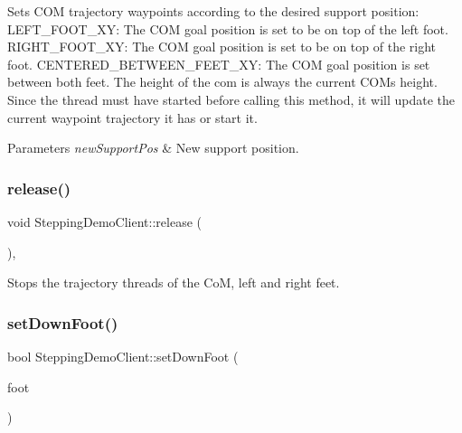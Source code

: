 Sets C\+OM trajectory waypoints according to the desired support position\+: L\+E\+F\+T\+\_\+\+F\+O\+O\+T\+\_\+\+XY\+: The C\+OM goal position is set to be on top of the left foot. R\+I\+G\+H\+T\+\_\+\+F\+O\+O\+T\+\_\+\+XY\+: The C\+OM goal position is set to be on top of the right foot. C\+E\+N\+T\+E\+R\+E\+D\+\_\+\+B\+E\+T\+W\+E\+E\+N\+\_\+\+F\+E\+E\+T\+\_\+\+XY\+: The C\+OM goal position is set between both feet. The height of the com is always the current C\+OM\textquotesingle{}s height. Since the thread must have started before calling this method, it will update the current waypoint trajectory it has or start it.


\begin{DoxyParams}{Parameters}
{\em new\+Support\+Pos} & New support position. \\
\hline
\end{DoxyParams}
\hypertarget{classSteppingDemoClient_aafcb227c0d7ce24823957e2331caa88b}{}\label{classSteppingDemoClient_aafcb227c0d7ce24823957e2331caa88b} 
\subsubsection{\texorpdfstring{release()}{release()}}
{\footnotesize\ttfamily void Stepping\+Demo\+Client\+::release (\begin{DoxyParamCaption}{ }\end{DoxyParamCaption})\hspace{0.3cm}{\ttfamily [protected]}, {\ttfamily [virtual]}}

Stops the trajectory threads of the CoM, left and right feet. \hypertarget{classSteppingDemoClient_a930123dad5658ea8a3bb5f23cb4cb369}{}\label{classSteppingDemoClient_a930123dad5658ea8a3bb5f23cb4cb369} 
\subsubsection{\texorpdfstring{set\+Down\+Foot()}{setDownFoot()}}
{\footnotesize\ttfamily bool Stepping\+Demo\+Client\+::set\+Down\+Foot (\begin{DoxyParamCaption}\item[{\hyperlink{SteppingDemoClient_8h_ab0673d7f17cdd57b8fa124abb330287f}{F\+O\+O\+T\+\_\+\+C\+O\+N\+T\+A\+C\+TS}}]{foot }\end{DoxyParamCaption})\hspace{0.3cm}{\ttfamily [private]}}

